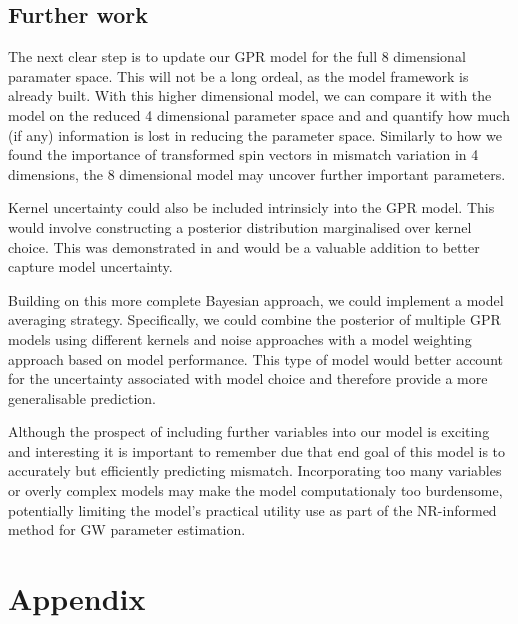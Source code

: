 \documentclass{ucdgradtaughtthesis}
\begin{document}
\section{Further work}
The next clear step is to update our GPR model for the full 8 dimensional paramater space. This will not be a long ordeal, as the model framework is already built.
With this higher dimensional model, we can compare it with the model on the reduced 4 dimensional parameter space and and quantify how much (if any) information is lost in reducing 
the parameter space. Similarly to how we found the importance of transformed spin vectors in mismatch variation in 4 dimensions, the 8 dimensional model may uncover
further important parameters. 

Kernel uncertainty could also be included intrinsicly into the GPR model. This would involve constructing a posterior distribution marginalised over kernel choice.
This was demonstrated in \cite{kernelposterior} and would be a valuable addition to better capture model uncertainty.

Building on this more complete Bayesian approach, we could implement a model averaging strategy. Specifically, 
we could combine the posterior of multiple GPR models using different kernels and noise approaches with a model weighting approach based on model performance. 
This type of model would better account for the uncertainty associated with model choice and therefore provide a more generalisable prediction.
%

Although the prospect of including further variables into our model is exciting and interesting it is important to remember
due that end goal of this model is to accurately but efficiently predicting mismatch. Incorporating too many variables or overly complex models may make the
model computationaly too burdensome, potentially limiting the model's practical utility use as part of the NR-informed method for GW parameter estimation.

\newpage
 


\chapter{Appendix}
\end{document}
